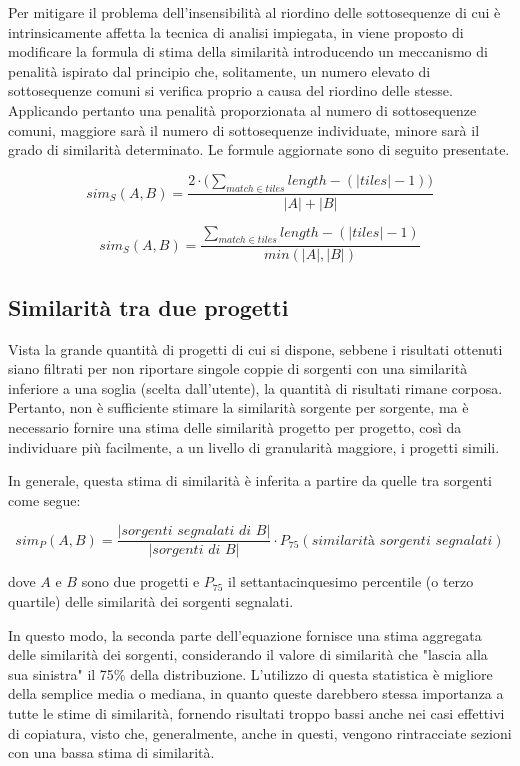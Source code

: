 Per mitigare il problema dell'insensibilità al riordino delle sottosequenze di cui è intrinsicamente affetta la tecnica di analisi impiegata, in \cite{es-plag} viene proposto di modificare la formula di stima della similarità introducendo un meccanismo di penalità ispirato dal principio che, solitamente, un numero elevato di sottosequenze comuni si verifica proprio a causa del riordino delle stesse. 
%
Applicando pertanto una penalità proporzionata al numero di sottosequenze comuni, maggiore sarà il numero di sottosequenze individuate, minore sarà il grado di similarità determinato.
%
Le formule aggiornate sono di seguito presentate.

\begin{equation}
	sim_S(A, B) = \frac{2 \cdot \bigl( \sum_{match \in tiles} length - (|tiles|-1) \bigr)}{|A|+|B|}
\end{equation}

\begin{equation}
	sim_S(A, B) = \frac{\sum_{match \in tiles} length - (|tiles|-1)}{min(|A|, |B|)}
\end{equation} 

\subsection*{Similarità tra due progetti}
Vista la grande quantità di progetti di cui si dispone, sebbene i risultati ottenuti siano filtrati per non riportare singole coppie di sorgenti con una similarità inferiore a una soglia (scelta dall'utente), la quantità di risultati rimane corposa.
%
Pertanto, non è sufficiente stimare la similarità sorgente per sorgente, ma è necessario fornire una stima delle similarità progetto per progetto, così da individuare più facilmente, a un livello di granularità maggiore, i progetti simili.

In generale, questa stima di similarità è inferita a partire da quelle tra sorgenti come segue:

\begin{equation}
	sim_P(A, B) = \frac{|\textit{sorgenti segnalati di B}|}{|\textit{sorgenti di B}|} \cdot P_{75}(\textit{similarità sorgenti segnalati})
\end{equation}

dove $A$ e $B$ sono due progetti e $P_{75}$ il settantacinquesimo percentile (o terzo quartile) delle similarità dei sorgenti segnalati.

In questo modo, la seconda parte dell'equazione fornisce una stima aggregata delle similarità dei sorgenti, considerando il valore di similarità che "lascia alla sua sinistra" il 75\% della distribuzione.
%
L'utilizzo di questa statistica è migliore della semplice media o mediana, in quanto queste darebbero stessa importanza a tutte le stime di similarità, fornendo risultati troppo bassi anche nei casi effettivi di copiatura, visto che, generalmente, anche in questi, vengono rintracciate sezioni con una bassa stima di similarità.

